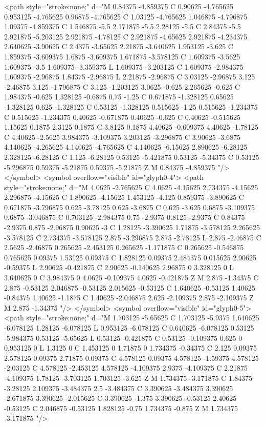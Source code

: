 <path style="stroke:none;" d="M 0.84375 -4.859375 C 0.90625 -4.765625 0.953125 -4.765625 0.96875 -4.765625 C 1.03125 -4.765625 1.046875 -4.796875 1.09375 -4.859375 C 1.546875 -5.5 2.171875 -5.5 2.28125 -5.5 C 2.84375 -5.5 2.921875 -5.203125 2.921875 -4.78125 C 2.921875 -4.65625 2.921875 -4.234375 2.640625 -3.90625 C 2.4375 -3.65625 2.21875 -3.640625 1.953125 -3.625 C 1.859375 -3.609375 1.6875 -3.609375 1.671875 -3.578125 C 1.609375 -3.5625 1.609375 -3.5 1.609375 -3.359375 L 1.609375 -3.203125 C 1.609375 -2.984375 1.609375 -2.96875 1.84375 -2.96875 L 2.21875 -2.96875 C 3.03125 -2.96875 3.125 -2.46875 3.125 -1.796875 C 3.125 -1.203125 3.0625 -0.625 2.265625 -0.625 C 1.984375 -0.625 1.328125 -0.6875 0.75 -1.25 C 0.671875 -1.328125 0.65625 -1.328125 0.625 -1.328125 C 0.53125 -1.328125 0.515625 -1.25 0.515625 -1.234375 C 0.515625 -1.234375 0.40625 -0.671875 0.40625 -0.625 C 0.40625 -0.515625 1.15625 0.1875 2.3125 0.1875 C 3.8125 0.1875 4.40625 -0.609375 4.40625 -1.78125 C 4.40625 -2.5625 3.984375 -3.109375 3.203125 -3.296875 C 3.90625 -3.6875 4.140625 -4.265625 4.140625 -4.765625 C 4.140625 -6.15625 2.890625 -6.28125 2.328125 -6.28125 C 1.125 -6.28125 0.53125 -5.421875 0.53125 -5.34375 C 0.53125 -5.296875 0.59375 -5.21875 0.59375 -5.21875 Z M 0.84375 -4.859375 "/>
</symbol>
<symbol overflow="visible" id="glyph0-4">
<path style="stroke:none;" d="M 4.0625 -2.765625 C 4.0625 -4.15625 2.734375 -4.15625 2.296875 -4.15625 C 1.890625 -4.15625 1.453125 -4.125 0.859375 -3.890625 C 0.671875 -3.796875 0.625 -3.78125 0.625 -3.6875 C 0.625 -3.625 0.6875 -3.109375 0.6875 -3.046875 C 0.703125 -2.984375 0.75 -2.9375 0.8125 -2.9375 C 0.84375 -2.9375 0.875 -2.96875 0.90625 -3 C 1.28125 -3.390625 1.71875 -3.578125 2.265625 -3.578125 C 2.734375 -3.578125 2.875 -3.296875 2.875 -2.78125 L 2.875 -2.46875 C 2.5625 -2.46875 0.265625 -2.453125 0.265625 -1.171875 C 0.265625 -0.546875 0.765625 0.09375 1.53125 0.09375 C 1.828125 0.09375 2.484375 0.015625 2.90625 -0.59375 L 2.90625 -0.421875 C 2.90625 -0.140625 2.96875 0 3.328125 0 L 3.640625 0 C 3.984375 0 4.0625 -0.109375 4.0625 -0.421875 Z M 2.875 -1.34375 C 2.875 -0.53125 2.046875 -0.53125 2.015625 -0.53125 C 1.640625 -0.53125 1.40625 -0.84375 1.40625 -1.1875 C 1.40625 -2.046875 2.625 -2.109375 2.875 -2.109375 Z M 2.875 -1.34375 "/>
</symbol>
<symbol overflow="visible" id="glyph0-5">
<path style="stroke:none;" d="M 1.703125 -5.65625 C 1.703125 -5.9375 1.640625 -6.078125 1.28125 -6.078125 L 0.953125 -6.078125 C 0.640625 -6.078125 0.53125 -5.984375 0.53125 -5.65625 L 0.53125 -0.421875 C 0.53125 -0.109375 0.625 0 0.953125 0 L 1.3125 0 C 1.453125 0 1.71875 0 1.734375 -0.34375 C 2.125 0.09375 2.578125 0.09375 2.71875 0.09375 C 4.578125 0.09375 4.578125 -1.59375 4.578125 -2.03125 C 4.578125 -2.453125 4.578125 -4.109375 2.9375 -4.109375 C 2.21875 -4.109375 1.78125 -3.703125 1.703125 -3.625 Z M 1.734375 -3.171875 C 1.84375 -3.28125 2.109375 -3.484375 2.5 -3.484375 C 3.390625 -3.484375 3.390625 -2.671875 3.390625 -2.015625 C 3.390625 -1.375 3.390625 -0.53125 2.40625 -0.53125 C 2.046875 -0.53125 1.828125 -0.75 1.734375 -0.875 Z M 1.734375 -3.171875 "/>

